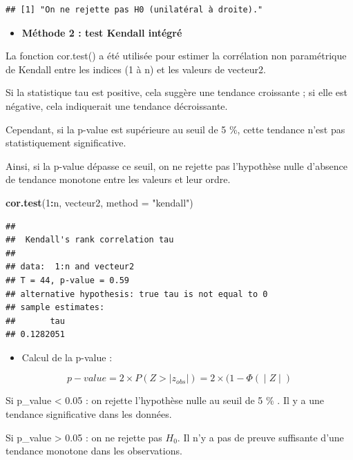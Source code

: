\documentclass[
  12pt,
]{article}
\newenvironment{Shaded}{\begin{snugshade}}{\end{snugshade}}
\newcommand{\AttributeTok}[1]{\textcolor[rgb]{0.13,0.29,0.53}{#1}}
\newcommand{\DecValTok}[1]{\textcolor[rgb]{0.00,0.00,0.81}{#1}}
\newcommand{\FunctionTok}[1]{\textcolor[rgb]{0.13,0.29,0.53}{\textbf{#1}}}
\newcommand{\NormalTok}[1]{#1}
\newcommand{\SpecialCharTok}[1]{\textcolor[rgb]{0.81,0.36,0.00}{\textbf{#1}}}
\newcommand{\StringTok}[1]{\textcolor[rgb]{0.31,0.60,0.02}{#1}}
\providecommand{\tightlist}{%
  \setlength{\itemsep}{0pt}\setlength{\parskip}{0pt}}
\begin{document}
\begin{verbatim}
## [1] "On ne rejette pas H0 (unilatéral à droite)."
\end{verbatim}

\begin{itemize}
\tightlist
\item
  \textbf{Méthode 2 : test Kendall intégré}
\end{itemize}

La fonction cor.test() a été utilisée pour estimer la corrélation non
paramétrique de Kendall entre les indices (1 à n) et les valeurs de
vecteur2.

Si la statistique tau est positive, cela suggère une tendance croissante
; si elle est négative, cela indiquerait une tendance décroissante.

Cependant, si la p-value est supérieure au seuil de 5 \%, cette tendance
n'est pas statistiquement significative.

Ainsi, si la p-value dépasse ce seuil, on ne rejette pas l'hypothèse
nulle d'absence de tendance monotone entre les valeurs et leur ordre.

\begin{Shaded}
\begin{Highlighting}[]
\FunctionTok{cor.test}\NormalTok{(}\DecValTok{1}\SpecialCharTok{:}\NormalTok{n, vecteur2, }\AttributeTok{method =} \StringTok{"kendall"}\NormalTok{)}
\end{Highlighting}
\end{Shaded}

\begin{verbatim}
## 
##  Kendall's rank correlation tau
## 
## data:  1:n and vecteur2
## T = 44, p-value = 0.59
## alternative hypothesis: true tau is not equal to 0
## sample estimates:
##       tau 
## 0.1282051
\end{verbatim}

\begin{itemize}
\tightlist
\item
  Calcul de la p-value :
\end{itemize}

\[p-value = 2 \times P(Z>|z_{obs}|)=2  \times (1− Φ(∣Z∣)\]

Si p\_value \textless{} 0.05 : on rejette l'hypothèse nulle au seuil de
5 \% . Il y a une tendance significative dans les données.

Si p\_value \textgreater{} 0.05 : on ne rejette pas \(H_0\). Il n'y a
pas de preuve suffisante d'une tendance monotone dans les observations.
\end{document}
